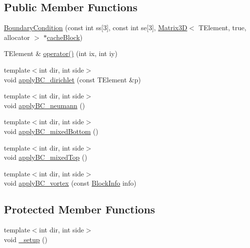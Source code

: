 \subsection*{Public Member Functions}
\begin{DoxyCompactItemize}
\item 
\hyperlink{class_boundary_condition_a89cbd322bff8127af5a49685e3bf04ce}{Boundary\+Condition} (const int ss\mbox{[}3\mbox{]}, const int se\mbox{[}3\mbox{]}, \hyperlink{class_matrix3_d}{Matrix3\+D}$<$ T\+Element, true, allocator $>$ $\ast$\hyperlink{class_boundary_condition_a1e0c33fa794a6d333d4451f8fde04c29}{cache\+Block})
\item 
T\+Element \& \hyperlink{class_boundary_condition_aadcfe05da7761b68191835b09d4d2cf0}{operator()} (int ix, int iy)
\item 
{\footnotesize template$<$int dir, int side$>$ }\\void \hyperlink{class_boundary_condition_adadad3f69ee5cf8ab11dc8f8a7763a4f}{apply\+B\+C\+\_\+dirichlet} (const T\+Element \&p)
\item 
{\footnotesize template$<$int dir, int side$>$ }\\void \hyperlink{class_boundary_condition_a101992951fb756135ca3e44f5d64bb60}{apply\+B\+C\+\_\+neumann} ()
\item 
{\footnotesize template$<$int dir, int side$>$ }\\void \hyperlink{class_boundary_condition_a60e154d33104f42e29dfa49061b266f6}{apply\+B\+C\+\_\+mixed\+Bottom} ()
\item 
{\footnotesize template$<$int dir, int side$>$ }\\void \hyperlink{class_boundary_condition_a77cf65bd542d198d80aa54a3de632ff5}{apply\+B\+C\+\_\+mixed\+Top} ()
\item 
{\footnotesize template$<$int dir, int side$>$ }\\void \hyperlink{class_boundary_condition_a81a9b161bd3b859dd3e58a15312f5b0f}{apply\+B\+C\+\_\+vortex} (const \hyperlink{struct_block_info}{Block\+Info} info)
\end{DoxyCompactItemize}
\subsection*{Protected Member Functions}
\begin{DoxyCompactItemize}
\item 
{\footnotesize template$<$int dir, int side$>$ }\\void \hyperlink{class_boundary_condition_af8969c6c584388f44cf464a8021d125a}{\+\_\+setup} ()
\end{DoxyCompactItemize}
